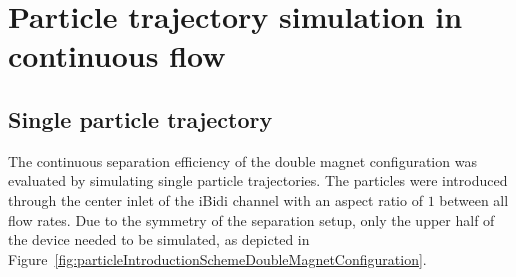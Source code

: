 %
%

\section{Particle trajectory simulation in continuous flow}\label{sec:particleTrajectorySimulationInContinuousFlow}

\subsection{Single particle trajectory}
\label{subsec:singleParticleTrajectory}
The continuous separation efficiency of the double magnet configuration was evaluated by simulating single particle trajectories. The particles were introduced through the center inlet of the iBidi channel with an aspect ratio of $1$ between all flow rates. Due to the symmetry of the separation setup, only the upper half of the device needed to be simulated, as depicted in Figure~\ref{fig:particleIntroductionSchemeDoubleMagnetConfiguration}. 

